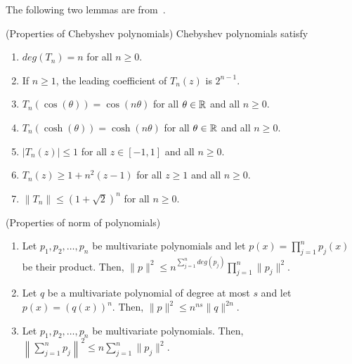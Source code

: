 The following two lemmas are
from~\cite{BeygelzimerPSTWZ2019-separable}.

\begin{lemma}
\label{lem:cheby-prop}
(Properties of Chebyshev polynomials) Chebyshev polynomials satisfy
\begin{enumerate}
    \item $deg(T_n) = n$ for all $n \geq 0$.
    \item If $n \geq 1$, the leading coefficient of $T_n(z)$ is $2^{n-1}$.
    \item $T_n(\cos (\theta)) = \cos (n\theta)$ for all $\theta \in {\mathbb{R}}$ and all $n \geq 0$.
    \item $T_n(\cosh (\theta)) = \cosh (n\theta)$ for all $\theta \in {\mathbb{R}}$ and all $n \geq 0$.
    \item $|T_n(z)| \leq 1$ for all $z \in [-1, 1]$ and all $n \geq 0$.
    \item $T_n(z) \geq 1 + n^2(z - 1)$ for all $z \geq 1$ and all $n \geq 0$.
    \item $\|T_n\| \leq (1+\sqrt{2})^n$ for all $n \geq 0$.
\end{enumerate}
\end{lemma}

\begin{lemma}
\label{lem:poly-prop}
(Properties of norm of polynomials) 
\begin{enumerate}
    \item Let $p_1,p_2,\ldots,p_n$ be multivariate polynomials and let $p(x)=\prod_{j=1}^n p_j(x)$
    be their product. Then, $\|p\|^2\leq n^{\sum_{j=1}^n deg(p_j)}\prod_{j=1}^n \|p_j\|^2$.
    \item Let $q$ be a multivariate polynomial of degree at most $s$ and let $p(x)=(q(x))^n$. Then,
    $\|p\|^2\leq n^{ns}\|q\|^{2n}$.
    \item Let $p_1,p_2,\ldots,p_n$ be multivariate polynomials. Then, 
    $\left\|\sum_{j=1}^n p_j\right\|^2 \leq n\sum_{j=1}^n \|p_j\|^2.$
\end{enumerate}
\end{lemma}